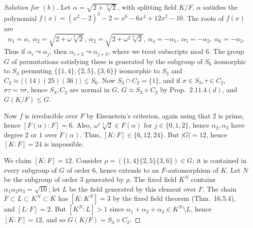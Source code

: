 \documentclass[12pt]{article}
\theoremstyle{remark}
\begin{document}
\begin{proof}[Solution for $(b)$]
  Let $\alpha = \sqrt{2+\sqrt[3]{2}}$, with splitting field $K/F$. $\alpha$ satisfies the polynomial $f(x) = (x^2-2)^3-2 = x^6 - 6x^4 + 12x^2 - 10$. The roots of $f(x)$ are
  \begin{equation*}
    \alpha_1 = \alpha, ~ \alpha_2 = \sqrt{2+\omega\sqrt[3]{2}}, ~  \alpha_2 = \sqrt{2+\omega^2\sqrt[3]{2}}, ~ \alpha_4 = -\alpha_1, ~ \alpha_5 = -\alpha_2, ~ \alpha_6 = -\alpha_3.
  \end{equation*}
  Thus if $\alpha_i \leadsto \alpha_j$, then $\alpha_{i+3} \leadsto \alpha_{j+3}$, where we treat subscripts mod $6$. The group $G$ of permutations satisfying these is generated by the subgroup of $S_6$ isomorphic to $S_3$ permuting $\{\{1,4\},\{2,5\},\{3,6\}\}$ isomorphic to $S_3$ and $C_2 \approx \langle(14)(25)(36)\rangle \leqslant S_6$. Now $S_3 \cap C_2 = \{1\}$, and if $\sigma \in S_3,\tau \in C_2$, $\sigma\tau = \tau\sigma$, hence $S_3,C_2$ are normal in $G$, $G \approx S_3 \times C_2$ by Prop.~$2.11.4(d)$, and $G(K/F) \leqslant G$.
  \par Now $f$ is irreducible over $F$ by Eisenstein's criterion, again using that $2$ is prime, hence $[F(\alpha) : F] = 6$. Also, $\omega^j\sqrt[3]{2} \in F(\alpha)$ for $j \in \{0,1,2\}$, hence $\alpha_2,\alpha_3$ have degree $2$ or $1$ over $F(\alpha)$. Thus, $[K : F] \in \{6,12,24\}$. But $\lvert G \rvert = 12$, hence $[K : F] = 24$ is impossible.
  \par We claim $[K : F] = 12$. Consider $\rho = (\{1,4\}\{2,5\}\{3,6\}) \in G$; it is contained in every subgroup of $G$ of order $6$, hence extends to an $F$-automorphism of $K$. Let $N$ be the subgroup of order $3$ generated by $\rho$. The fixed field $K^N$ contains $\alpha_1\alpha_2\alpha_3 = \sqrt{10}$; let $L$ be the field generated by this element over $F$. The chain $F \subset L \subset K^N \subset K$ has $[K : K^N] = 3$ by the fixed field theorem (Thm.~16.5.4), and $[L : F] = 2$. But $[K^N : L] > 1$ since $\alpha_1 + \alpha_2 + \alpha_3 \in K^N \setminus L$, hence $[K : F] = 12$, and so $G(K/F) = S_3 \times C_2$.
\end{proof}
\end{document}
